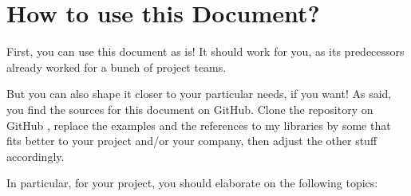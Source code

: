 \documentclass[11pt,a4paper, titlepage, parskip=half, headsepline, footsepline, cleardoublepage=current, headheight=1cm]{scrbook}
\begin{document}
\section{How to use this Document?}\label{sec:HowToUseThisDocument}
First, you can use this document as is! It should work for you, as its predecessors already worked for a bunch of project teams.

But you can also shape it closer to your particular needs, if you want! As said, you find the sources for this document on GitHub. Clone the repository on GitHub \autocite{TQUADRAT_ORG_DOCUMENT_REPOSITORY}, replace the examples and the references to my libraries by some that fits better to your project and/or your company, then adjust the other stuff accordingly.

In particular, for your project, you should elaborate on the following topics:
\end{document}
